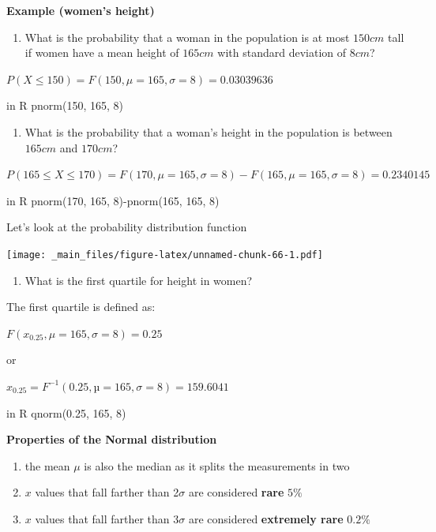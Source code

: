 \documentclass[
]{book}
\providecommand{\tightlist}{%
  \setlength{\itemsep}{0pt}\setlength{\parskip}{0pt}}
\begin{document}
\textbf{Example (women's height)}

\begin{enumerate}
\def\labelenumi{\arabic{enumi})}
\tightlist
\item
  What is the probability that a woman in the population is at most \(150cm\) tall if women have a mean height of \(165cm\) with standard deviation of \(8cm\)?
\end{enumerate}

\(P(X\le 150)=F(150, \mu=165, \sigma=8)=0.03039636\)

in R pnorm(150, 165, 8)

\begin{enumerate}
\def\labelenumi{\arabic{enumi})}
\setcounter{enumi}{1}
\tightlist
\item
  What is the probability that a woman's height in the population is between \(165cm\) and \(170cm\)?
\end{enumerate}

\(P(165 \le X \le 170)=F(170, \mu=165, \sigma=8)-F(165, \mu=165, \sigma=8)=0.2340145\)

in R pnorm(170, 165, 8)-pnorm(165, 165, 8)

Let's look at the probability distribution function

\texttt{[image: \_main\_files/figure-latex/unnamed-chunk-66-1.pdf]}

\begin{enumerate}
\def\labelenumi{\arabic{enumi})}
\setcounter{enumi}{2}
\tightlist
\item
  What is the first quartile for height in women?
\end{enumerate}

The first quartile is defined as:

\(F(x_{0.25}, \mu=165, \sigma=8)=0.25\)

or

\(x_{0.25}=F^{-1}(0.25, µ=165, \sigma=8)=159.6041\)

in R qnorm(0.25, 165, 8)

\textbf{Properties of the Normal distribution}

\begin{enumerate}
\def\labelenumi{\arabic{enumi})}
\item
  the mean \(\mu\) is also the median as it splits the measurements in two
\item
  \(x\) values that fall farther than 2\(\sigma\) are considered \textbf{rare} \(5\%\)
\item
  \(x\) values that fall farther than 3\(\sigma\) are considered \textbf{extremely rare} \(0.2\%\)
\end{enumerate}
\end{document}
